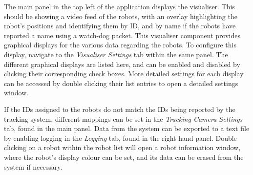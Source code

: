 The main panel in the top left of the application displays the visualiser. This should be showing a video feed of the robots, with an overlay highlighting the robot's positions and identifying them by ID, and by name if the robots have reported a name using a watch-dog packet. This visualiser component provides graphical displays for the various data regarding the robots. To configure this display, navigate to the \textit{Visualiser Settings} tab within the same panel. The different graphical displays are listed here, and can be enabled and disabled by clicking their corresponding check boxes. More detailed settings for each display can be accessed by double clicking their list entries to open a detailed settings window.

If the IDs assigned to the robots do not match the IDs being reported by the tracking system, different mappings can be set in the \textit{Tracking Camera Settings} tab, found in the main panel. Data from the system can be exported to a text file by enabling logging in the \textit{Logging} tab, found in the right hand panel. Double clicking on a robot within the robot list will open a robot information window, where the robot's display colour can be set, and its data can be erased from the system if necessary.